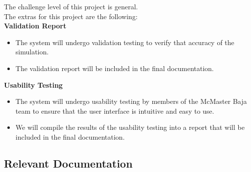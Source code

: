 \documentclass[12pt, titlepage]{article}
\begin{document}
The challenge level of this project is general.\\
\newline
The extras for this project are the following:\\
\textbf{Validation Report}
{\begin{itemize}
  \item The system will undergo validation testing to verify that accuracy of the simulation.
  \item The validation report will be included in the final documentation.
\end{itemize}}
{\noindent}
\textbf{Usability Testing}
{\begin{itemize}
  \item The system will undergo usability testing by members of the McMaster Baja team to ensure that
  the user interface is intuitive and easy to use.
  \item We will compile the results of the usability testing into a report that will be included in the final documentation.
\end{itemize}}

\subsection{Relevant Documentation}

\end{document}
